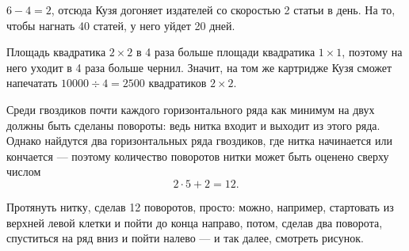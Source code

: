 ﻿
\begin{itemize}

\itA $6-4=2$, отсюда Кузя догоняет издателей со скоростью 2 статьи в день. На то, чтобы нагнать 40 статей, у него уйдет 20 дней.

\itB Площадь квадратика $2 \times 2$ в 4 раза больше площади квадратика $1 \times 1$, поэтому на него уходит в 4 раза больше чернил. Значит, на том же картридже Кузя сможет напечатать $10000 \div 4 = 2500$ квадратиков $2 \times 2$.

\itC Среди гвоздиков почти каждого горизонтального ряда как минимум на двух должны быть сделаны повороты: ведь нитка входит и выходит из этого ряда. Однако найдутся два горизонтальных ряда гвоздиков, где нитка начинается или кончается — поэтому количество поворотов нитки может быть оценено сверху числом
$$2 \cdot 5 + 2 =12.$$

\vspace{-0.25cm}
Протянуть нитку, сделав 12 поворотов, просто: можно, например, стартовать из верхней левой клетки и пойти до конца направо, потом, сделав два поворота, спуститься на ряд вниз и пойти налево — и так далее, смотреть рисунок.

\begin{center}  \end{center}

\end{itemize}
